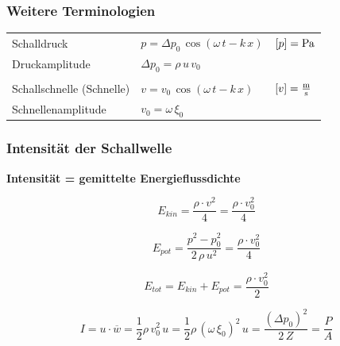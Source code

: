 \subsubsection{Weitere Terminologien}

\renewcommand{\arraystretch}{1.2}
\begin{tabular}{lll}
Schalldruck & $p = \Delta p_0 \, \cos(\omega \, t - k \, x)$ & $[p] = \mathrm{Pa}$ \\
Druckamplitude & $  \Delta p_0 = \rho \, u \, v_0 $ & \\
\\
Schallschnelle (Schnelle) & $v = v_0 \,  \cos(\omega \, t - k \, x)$ & $[v] = \frac{\mathrm{m}}{\mathrm{s}}$ \\
Schnellenamplitude & $v_0 = \omega \, \xi_0$ 
\end{tabular}
\renewcommand{\arraystretch}{1}





\subsubsection{Intensität der Schallwelle}

\textbf{Intensität = gemittelte Energieflussdichte} \\

\begin{minipage}{0.48\linewidth}
$$ E_{kin} = \frac{\rho \cdot v^2}{4} = \frac{\rho \cdot v_0^2}{4} $$
\end{minipage}
\hfill
\begin{minipage}{0.48\linewidth}
$$ E_{pot} = \frac{p^2 - p_0^2}{2 \, \rho \, u^2} = \frac{\rho \cdot v_0^2}{4} $$
\end{minipage}

$$ E_{tot} = E_{kin} + E_{pot} = \frac{\rho \cdot v_0^2}{2} $$


$$ \boxed{ I = u \cdot \overline{w} = \frac{1}{2} \rho \, v_0^2 \, u  =  \frac{1}{2} \rho \, (\omega \, \xi_0)^2  \, u = \frac{( \Delta p_0)^2}{2 \, Z} = \frac{P}{A} } $$

\vspace{0.2cm}

